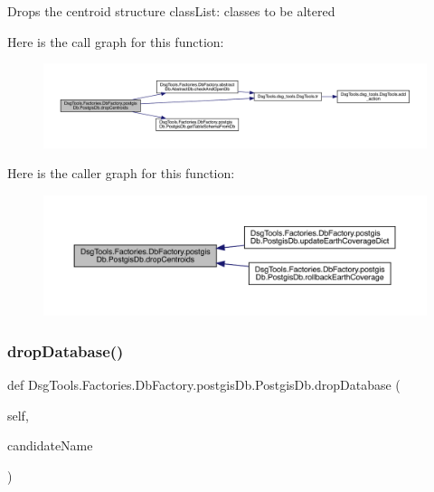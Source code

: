 \begin{DoxyVerb}Drops the centroid structure
classList: classes to be altered
\end{DoxyVerb}
 Here is the call graph for this function\+:
\nopagebreak
\begin{figure}[H]
\begin{center}
\leavevmode
\includegraphics[width=350pt]{class_dsg_tools_1_1_factories_1_1_db_factory_1_1postgis_db_1_1_postgis_db_a38741d156f8168459c1e9579aac213d2_cgraph}
\end{center}
\end{figure}
Here is the caller graph for this function\+:
\nopagebreak
\begin{figure}[H]
\begin{center}
\leavevmode
\includegraphics[width=350pt]{class_dsg_tools_1_1_factories_1_1_db_factory_1_1postgis_db_1_1_postgis_db_a38741d156f8168459c1e9579aac213d2_icgraph}
\end{center}
\end{figure}
\mbox{\label{class_dsg_tools_1_1_factories_1_1_db_factory_1_1postgis_db_1_1_postgis_db_a806f1af3bf1bfc9c7fa5c4e322e0ef30}} 
\subsubsection{\texorpdfstring{drop\+Database()}{dropDatabase()}}
{\footnotesize\ttfamily def Dsg\+Tools.\+Factories.\+Db\+Factory.\+postgis\+Db.\+Postgis\+Db.\+drop\+Database (\begin{DoxyParamCaption}\item[{}]{self,  }\item[{}]{candidate\+Name }\end{DoxyParamCaption})}

